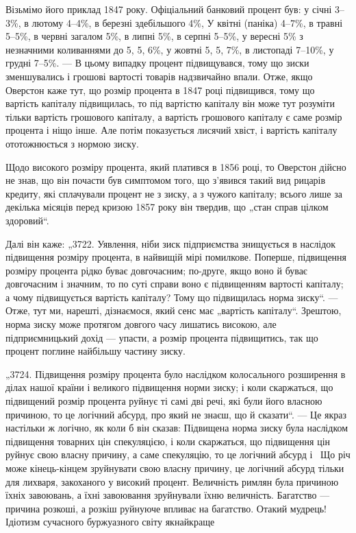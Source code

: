 Візьмімо його приклад 1847 року. Офіціальний банковий процент був: у січні 3--3\%,
в лютому 4--4\%, в березні здебільшого 4\%, У квітні (паніка) 4--7\%, в травні 5--5\%, в червні загалом 5\%,
в липні 5\%, в серпні 5--5\%, у вересні 5\% з незначними
коливаннями до 5, 5, 6\%, у жовтні 5, 5, 7\%, в листопаді 7--10\%, у грудні 7--5\%. — В цьому
випадку процент підвищувався,
тому що зиски зменшувались і грошові вартості товарів надзвичайно впали. Отже, якщо Оверстон каже
тут, що розмір процента
в 1847 році підвищився, тому що вартість капіталу підвищилась,
то під вартістю капіталу він може тут розуміти тільки вартість
грошового капіталу, а вартість грошового капіталу є саме розмір
процента і ніщо інше. Але потім показується лисячий хвіст,
і вартість капіталу ототожнюється з нормою зиску.

Щодо високого розміру процента, який платився в 1856 році,
то Оверстон дійсно не знав, що він почасти був симптомом того,
що з’явився такий вид рицарів кредиту, які сплачували процент
не з зиску, а з чужого капіталу; всього лише за декілька місяців
перед кризою 1857 року він твердив, що „стан справ цілком
здоровий“.

Далі він каже: „3722. Уявлення, ніби зиск підприємства знищується в наслідок підвищення розміру
процента, в найвищій
мірі помилкове. Поперше, підвищення розміру процента рідко
буває довгочасним; по-друге, якщо воно й буває довгочасним
і значним, то по суті справи воно є підвищенням вартості капіталу; а чому підвищується вартість
капіталу? Тому що підвищилась норма зиску“. — Отже, тут ми, нарешті, дізнаємося,
який сенс має „вартість капіталу“. Зрештою, норма зиску може
протягом довгого часу лишатись високою, але підприємницький
дохід — упасти, а розмір процента підвищитись, так що процент поглине найбільшу частину зиску.

„3724. Підвищення розміру процента було наслідком колосального
розширення в ділах нашої країни і великого підвищення норми зиску; і коли скаржаться, що підвищений
розмір
процента руйнує ті самі дві речі, які були його власною причиною, то це логічний абсурд, про який не
знаєш, що й сказати“. — Це якраз настільки ж логічно, як коли б він сказав:
Підвищена норма зиску була наслідком підвищення товарних
цін спекуляцією, і коли скаржаться, що підвищення цін руйнує
свою власну причину, а саме спекуляцію, то це логічний абсурд
і~ Що річ може кінець-кінцем зруйнувати свою власну причину, це логічний абсурд тільки для
лихваря, закоханого у високий процент. Величність римлян була причиною їхніх завоювань,
а їхні завоювання зруйнували їхню величність. Багатство — причина
розкоші, а розкіш руйнуюче впливає на багатство. Отакий
мудрець! Ідіотизм сучасного буржуазного світу якнайкраще
\parbreak{}  %
